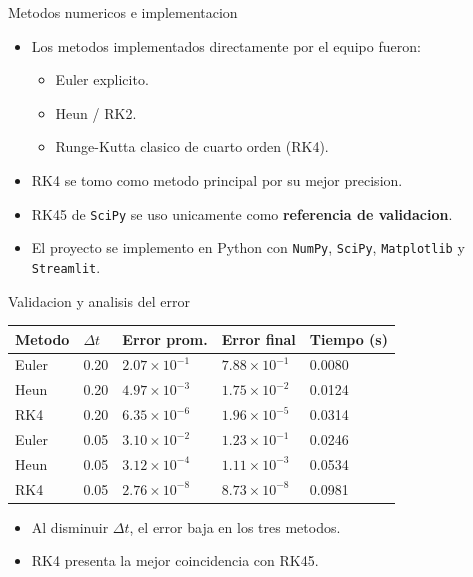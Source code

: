 \documentclass[aspectratio=169]{beamer}
\begin{document}
\begin{frame}{Metodos numericos e implementacion}
  \begin{itemize}
    \item Los metodos implementados directamente por el equipo fueron:
    \begin{itemize}
      \item Euler explicito.
      \item Heun / RK2.
      \item Runge-Kutta clasico de cuarto orden (RK4).
    \end{itemize}
    \item RK4 se tomo como metodo principal por su mejor precision.
    \item RK45 de \texttt{SciPy} se uso unicamente como \textbf{referencia de validacion}.
    \item El proyecto se implemento en Python con \texttt{NumPy}, \texttt{SciPy}, \texttt{Matplotlib} y \texttt{Streamlit}.
  \end{itemize}
\end{frame}

\begin{frame}{Validacion y analisis del error}
  \begin{table}
    \centering
    \scriptsize
    \begin{tabular}{lllll}
      \toprule
      Metodo & $\Delta t$ & Error prom. & Error final & Tiempo (s) \\
      \midrule
      Euler & 0.20 & $2.07\times10^{-1}$ & $7.88\times10^{-1}$ & 0.0080 \\
      Heun  & 0.20 & $4.97\times10^{-3}$ & $1.75\times10^{-2}$ & 0.0124 \\
      RK4   & 0.20 & $6.35\times10^{-6}$ & $1.96\times10^{-5}$ & 0.0314 \\
      Euler & 0.05 & $3.10\times10^{-2}$ & $1.23\times10^{-1}$ & 0.0246 \\
      Heun  & 0.05 & $3.12\times10^{-4}$ & $1.11\times10^{-3}$ & 0.0534 \\
      RK4   & 0.05 & $2.76\times10^{-8}$ & $8.73\times10^{-8}$ & 0.0981 \\
      \bottomrule
    \end{tabular}
  \end{table}

  \vspace{0.3cm}
  \begin{itemize}
    \item Al disminuir $\Delta t$, el error baja en los tres metodos.
    \item RK4 presenta la mejor coincidencia con RK45.
  \end{itemize}
\end{frame}
\end{document}
